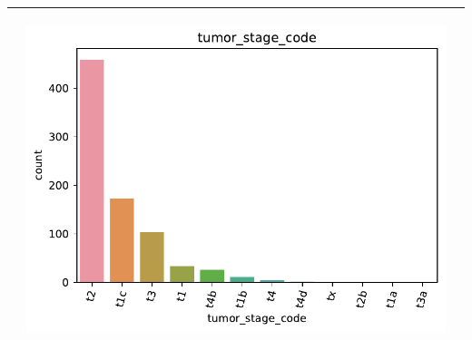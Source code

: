 \begin{table}[!htb]
\begin{threeparttable}
\begin{tabular}{p{2.5cm} p{7cm} p{6.5cm}}
			& \begin{center}\includegraphics[width=1\linewidth]{NOTEBOOK/IMAGENES_DESCRIPTIVAS/5_tumor_stage_code}\end{center}
			\\ \hline
		\end{tabular}
	\end{threeparttable}
\end{table}


